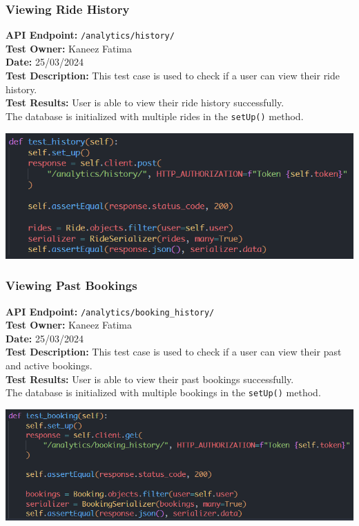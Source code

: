 \documentclass[11pt]{article}
\begin{document}
\subsubsection{Viewing Ride History}
\textbf{API Endpoint: } \texttt{/analytics/history/} \\
\textbf{Test Owner: } Kaneez Fatima \\
\textbf{Date: } 25/03/2024 \\
\textbf{Test Description: } This test case is used to check if a user can view their ride history. \\
\textbf{Test Results: } User is able to view their ride history successfully.\\
The database is initialized with multiple rides in the \texttt{setUp()} method.
\begin{center}
    \includegraphics[scale=0.8]{unit_testing_codes/ride_history.png}
\end{center}

\subsubsection{Viewing Past Bookings}
\textbf{API Endpoint: } \texttt{/analytics/booking\_history/} \\
\textbf{Test Owner: } Kaneez Fatima \\
\textbf{Date: } 25/03/2024 \\
\textbf{Test Description: } This test case is used to check if a user can view their past and active bookings. \\
\textbf{Test Results: } User is able to view their past bookings successfully.\\
The database is initialized with multiple bookings in the \texttt{setUp()} method.
\begin{center}
    \includegraphics[scale=0.7]{unit_testing_codes/booking_history.png}
\end{center}
\end{document}
